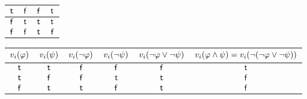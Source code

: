 \begin{myCorollary}
\begin{table}[H]
\begin{subtable}{\linewidth}
\begin{tabular}{|c|c|c|c|}
        $\mathsf{t}$                                  & $\mathsf{f}$                              & $\mathsf{f}$                                      & $\mathsf{t}$                                                                                                      \\ \hline
        $\mathsf{f}$                                 & $\mathsf{t}$                               & $\mathsf{t}$                                       & $\mathsf{t}$                                                                                                      \\ \hline
        $\mathsf{f}$                                 & $\mathsf{f}$                              & $\mathsf{t}$                                       & $\mathsf{f}$                                                                                                     \\ \hline
      \end{tabular}
    \end{subtable}
    \linebreak
    \begin{subtable}{\linewidth}\centering
      \centering
      \begin{tabular}{|c|c|c|c|c|c|}\hline
        $v_i(\varphi)$ & $v_i(\psi)$ & $v_i(\lnot\varphi)$ & $v_i(\lnot\psi)$ & $v_i(\lnot \varphi \lor \lnot\psi)$ & $v_i(\varphi \land \psi) = v_i(\lnot(\lnot\varphi \lor \lnot\psi))$ \\ \hline
        $\mathsf{t}$                                  & $\mathsf{t}$                               & $\mathsf{f}$                                      & $\mathsf{f}$                                   & $\mathsf{f}$                                                      & $\mathsf{t}$                                                                                                                 \\ \hline
        $\mathsf{t}$                                  & $\mathsf{f}$                              & $\mathsf{f}$                                      & $\mathsf{t}$                                    & $\mathsf{t}$                                                       & $\mathsf{f}$                                                                                                                \\ \hline
        $\mathsf{f}$                                 & $\mathsf{t}$                               & $\mathsf{t}$                                       & $\mathsf{f}$                                   & $\mathsf{t}$                                                       & $\mathsf{f}$                                                                                                                \\ \hline

\end{tabular}
\end{subtable}
\end{table}
\end{myCorollary}
